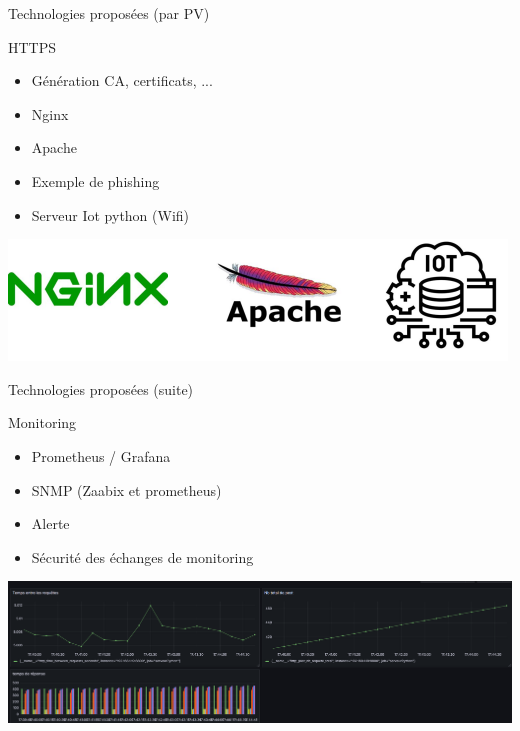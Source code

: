 \documentclass[12pt, handout]{beamer}
\begin{document}
\begin{frame}{Technologies proposées (par PV)}

\begin{block}{HTTPS}
\begin{itemize}
\item Génération CA, certificats, ...
\item Nginx
\item Apache
\item Exemple de phishing
\item Serveur Iot python (Wifi)
\end{itemize}
\end{block}

\begin{center}
\includegraphics[scale=0.5]{./ressource/httpsPresentation}
\end{center}
\end{frame}
\begin{frame}{Technologies proposées (suite)}

\begin{block}{Monitoring}
\begin{itemize}
\item Prometheus / Grafana
\item SNMP (Zaabix et prometheus)
\item Alerte
\item Sécurité des échanges de monitoring
\end{itemize}
\end{block}
\begin{center}
\includegraphics[scale=0.2]{./ressource/exPanel.png}
\end{center}
\end{frame}
\end{document}
